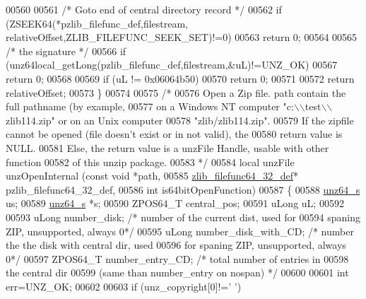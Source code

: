 \begin{DoxyCode}
00560 
00561     \textcolor{comment}{/* Goto end of central directory record */}
00562     \textcolor{keywordflow}{if} (ZSEEK64(*pzlib\_filefunc\_def,filestream, relativeOffset,ZLIB\_FILEFUNC\_SEEK\_SET)!=0)
00563         \textcolor{keywordflow}{return} 0;
00564 
00565      \textcolor{comment}{/* the signature */}
00566     \textcolor{keywordflow}{if} (unz64local\_getLong(pzlib\_filefunc\_def,filestream,&uL)!=UNZ\_OK)
00567         \textcolor{keywordflow}{return} 0;
00568 
00569     \textcolor{keywordflow}{if} (uL != 0x06064b50)
00570         \textcolor{keywordflow}{return} 0;
00571 
00572     \textcolor{keywordflow}{return} relativeOffset;
00573 \}
00574 
00575 \textcolor{comment}{/*}
00576 \textcolor{comment}{  Open a Zip file. path contain the full pathname (by example,}
00577 \textcolor{comment}{     on a Windows NT computer "c:\(\backslash\)\(\backslash\)test\(\backslash\)\(\backslash\)zlib114.zip" or on an Unix computer}
00578 \textcolor{comment}{     "zlib/zlib114.zip".}
00579 \textcolor{comment}{     If the zipfile cannot be opened (file doesn't exist or in not valid), the}
00580 \textcolor{comment}{       return value is NULL.}
00581 \textcolor{comment}{     Else, the return value is a unzFile Handle, usable with other function}
00582 \textcolor{comment}{       of this unzip package.}
00583 \textcolor{comment}{*/}
00584 local unzFile unzOpenInternal (\textcolor{keyword}{const} \textcolor{keywordtype}{void} *path,
00585                                \hyperlink{structzlib__filefunc64__32__def__s}{zlib\_filefunc64\_32\_def}* pzlib\_filefunc64\_32\_def,
00586                                \textcolor{keywordtype}{int} is64bitOpenFunction)
00587 \{
00588     \hyperlink{structunz64__s}{unz64\_s} us;
00589     \hyperlink{structunz64__s}{unz64\_s} *s;
00590     ZPOS64\_T central\_pos;
00591     uLong   uL;
00592 
00593     uLong number\_disk;          \textcolor{comment}{/* number of the current dist, used for}
00594 \textcolor{comment}{                                   spaning ZIP, unsupported, always 0*/}
00595     uLong number\_disk\_with\_CD;  \textcolor{comment}{/* number the the disk with central dir, used}
00596 \textcolor{comment}{                                   for spaning ZIP, unsupported, always 0*/}
00597     ZPOS64\_T number\_entry\_CD;      \textcolor{comment}{/* total number of entries in}
00598 \textcolor{comment}{                                   the central dir}
00599 \textcolor{comment}{                                   (same than number\_entry on nospan) */}
00600 
00601     \textcolor{keywordtype}{int} err=UNZ\_OK;
00602 
00603     \textcolor{keywordflow}{if} (unz\_copyright[0]!=\textcolor{charliteral}{' '})

\end{DoxyCode}

